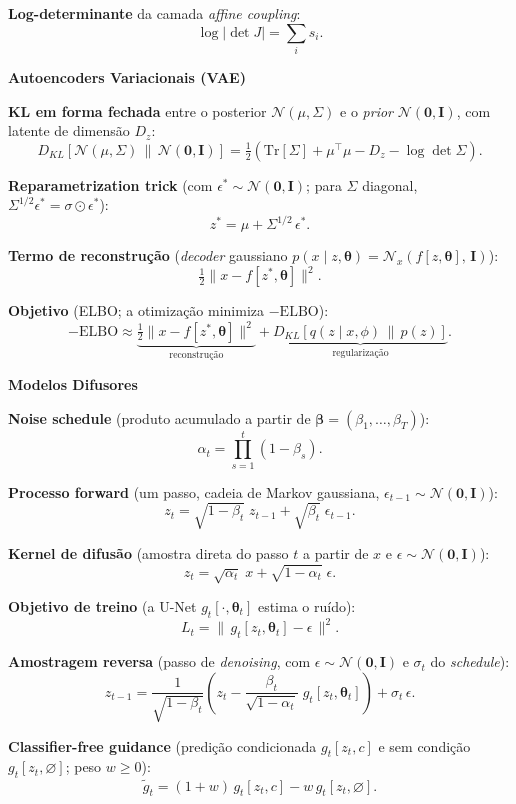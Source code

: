 \documentclass[11pt,a4paper]{article}
\newcommand{\thetav}{\boldsymbol{\theta}}
\newcommand{\Nc}{\mathcal{N}}
\newcommand{\bloco}[1]{%
  \par\vspace{0.3em}%
  {\bfseries\large #1}\par%
  \vspace{-0.4em}{\color{gray!60}\rule{\linewidth}{0.4pt}}\par%
}
\begin{document}
\textbf{Log-determinante} da camada \textit{affine coupling}:
\[
  \log\bigl|\det J\bigr| = \sum_i s_i.
\]

\bloco{Autoencoders Variacionais (VAE)}

\textbf{KL em forma fechada} entre o posterior $\Nc(\mu,\Sigma)$ e o \textit{prior} $\Nc(\mathbf{0},\mathbf{I})$, com latente de dimensão $D_z$:
\[
  D_{KL}\!\left[\Nc(\mu,\Sigma)\,\big\|\,\Nc(\mathbf{0},\mathbf{I})\right]
  = \tfrac{1}{2}\left(\mathrm{Tr}[\Sigma] + \mu^{\top}\mu - D_z - \log\det\Sigma\right).
\]

\textbf{Reparametrization trick} (com $\epsilon^{*} \sim \Nc(\mathbf{0},\mathbf{I})$; para $\Sigma$ diagonal, $\Sigma^{1/2}\epsilon^{*} = \sigma \odot \epsilon^{*}$):
\[
  z^{*} = \mu + \Sigma^{1/2}\,\epsilon^{*}.
\]

\textbf{Termo de reconstrução} (\textit{decoder} gaussiano $p(x \mid z,\thetav) = \Nc_x\!\left(f[z,\thetav],\,\mathbf{I}\right)$):
\[
  \tfrac{1}{2}\bigl\lVert x - f[z^{*},\thetav]\bigr\rVert^{2}.
\]

\textbf{Objetivo} (ELBO; a otimização minimiza $-\mathrm{ELBO}$):
\[
  -\mathrm{ELBO} \approx \underbrace{\tfrac{1}{2}\bigl\lVert x - f[z^{*},\thetav]\bigr\rVert^{2}}_{\text{reconstrução}}
  + \underbrace{D_{KL}\!\left[q(z \mid x,\phi)\,\|\,p(z)\right]}_{\text{regularização}}.
\]

\bloco{Modelos Difusores}

\textbf{Noise schedule} (produto acumulado a partir de $\boldsymbol{\beta} = (\beta_1, \dots, \beta_T)$):
\[
  \alpha_t = \prod_{s=1}^{t}\left(1 - \beta_s\right).
\]

\textbf{Processo forward} (um passo, cadeia de Markov gaussiana, $\epsilon_{t-1} \sim \Nc(\mathbf{0},\mathbf{I})$):
\[
  z_t = \sqrt{1 - \beta_t}\; z_{t-1} + \sqrt{\beta_t}\; \epsilon_{t-1}.
\]

\textbf{Kernel de difusão} (amostra direta do passo $t$ a partir de $x$ e $\epsilon \sim \Nc(\mathbf{0},\mathbf{I})$):
\[
  z_t = \sqrt{\alpha_t}\; x + \sqrt{1 - \alpha_t}\; \epsilon.
\]

\textbf{Objetivo de treino} (a U-Net $g_t[\cdot,\thetav_t]$ estima o ruído):
\[
  L_t = \bigl\lVert\, g_t[z_t, \thetav_t] - \epsilon \,\bigr\rVert^{2}.
\]

\textbf{Amostragem reversa} (passo de \textit{denoising}, com $\epsilon \sim \Nc(\mathbf{0},\mathbf{I})$ e $\sigma_t$ do \textit{schedule}):
\[
  z_{t-1} = \frac{1}{\sqrt{1 - \beta_t}}\left(z_t - \frac{\beta_t}{\sqrt{1 - \alpha_t}}\; g_t[z_t,\thetav_t]\right) + \sigma_t\, \epsilon.
\]

\textbf{Classifier-free guidance} (predição condicionada $g_t[z_t, c]$ e sem condição $g_t[z_t, \varnothing]$; peso $w \geq 0$):
\[
  \tilde{g}_t = (1 + w)\, g_t[z_t, c] - w\, g_t[z_t, \varnothing].
\]
\end{document}
